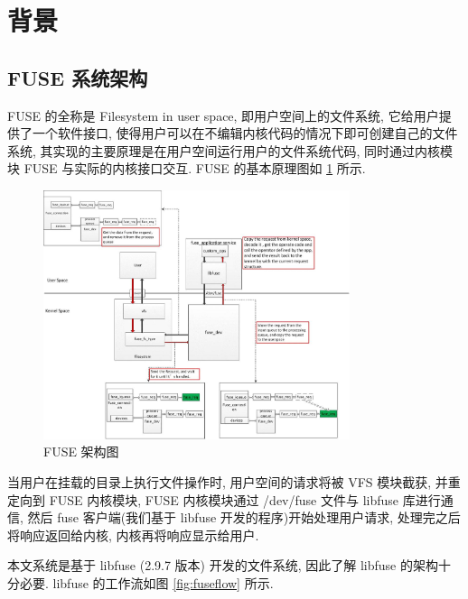﻿%



%


\section{背景}
\subsection{FUSE 系统架构}
FUSE 的全称是 Filesystem in user space, 即用户空间上的文件系统,
它给用户提供了一个软件接口, 使得用户可以在不编辑内核代码的情况下即可创建自己的文件系统,
其实现的主要原理是在用户空间运行用户的文件系统代码,
同时通过内核模块 FUSE 与实际的内核接口交互. FUSE 的基本原理图如 \ref{fig:fuse_structure}
所示.

\begin{figure}[H]
    \centerline{\includegraphics[width=0.8\textwidth]{./Figures/fusestruct.png}}
    \caption{FUSE 架构图}
    \label{fig:fuse_structure}
\end{figure}

当用户在挂载的目录上执行文件操作时, 用户空间的请求将被 VFS 模块截获,
并重定向到 FUSE 内核模块, FUSE 内核模块通过 /dev/fuse 文件与 libfuse 库进行通信,
然后 fuse 客户端(我们基于 libfuse 开发的程序)开始处理用户请求, 处理完之后将响应返回给内核,
内核再将响应显示给用户.

本文系统是基于 libfuse (2.9.7 版本) 开发的文件系统, 因此了解 libfuse 的架构十分必要.
libfuse 的工作流如图 \ref{fig:fuseflow} 所示.

